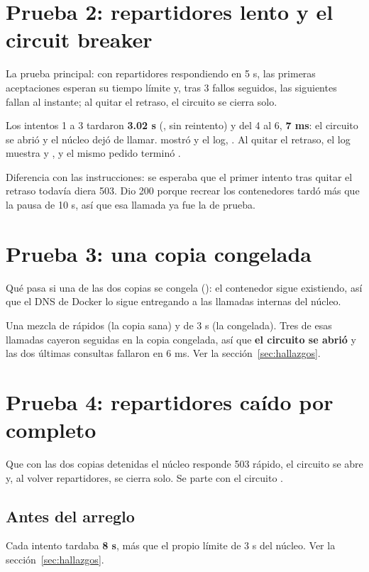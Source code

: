 \documentclass[11pt]{article}
\newcommand{\evidencia}[1]{}
\begin{document}
\section{Prueba 2: repartidores lento y el circuit breaker}
\queria La prueba principal: con repartidores respondiendo en 5 s, las primeras aceptaciones esperan su
tiempo límite y, tras 3 fallos seguidos, las siguientes fallan al instante; al quitar el retraso, el
circuito se cierra solo.
\evidencia{prueba-2.txt}
\observado Los intentos 1 a 3 tardaron \textbf{3.02 s} (, sin reintento) y del 4 al 6,
\textbf{7 ms}: el circuito se abrió y el núcleo dejó de llamar.  mostró  y el
log, . Al quitar el retraso, el log muestra
 y , y el mismo pedido terminó .

Diferencia con las instrucciones: se esperaba que el primer intento tras quitar el retraso todavía diera
503. Dio 200 porque recrear los contenedores tardó más que la pausa de 10 s, así que esa llamada ya fue la
de prueba. \hfill\ok

\section{Prueba 3: una copia congelada}
\queria Qué pasa si una de las dos copias se congela (): el contenedor sigue existiendo,
así que el DNS de Docker lo sigue entregando a las llamadas internas del núcleo.
\evidencia{prueba-3.txt}
\observado Una mezcla de  rápidos (la copia sana) y  de 3 s (la congelada). Tres de
esas llamadas cayeron seguidas en la copia congelada, así que \textbf{el circuito se abrió} y las dos
últimas consultas fallaron en 6 ms. Ver la sección~\ref{sec:hallazgos}. \hfill\ok

\section{Prueba 4: repartidores caído por completo}
\queria Que con las dos copias detenidas el núcleo responde 503 rápido, el circuito se abre y, al volver
repartidores, se cierra solo. Se parte con el circuito .

\subsection{Antes del arreglo}

Cada intento tardaba \textbf{8 s}, más que el propio límite de 3 s del núcleo. Ver la
sección~\ref{sec:hallazgos}.
\end{document}
